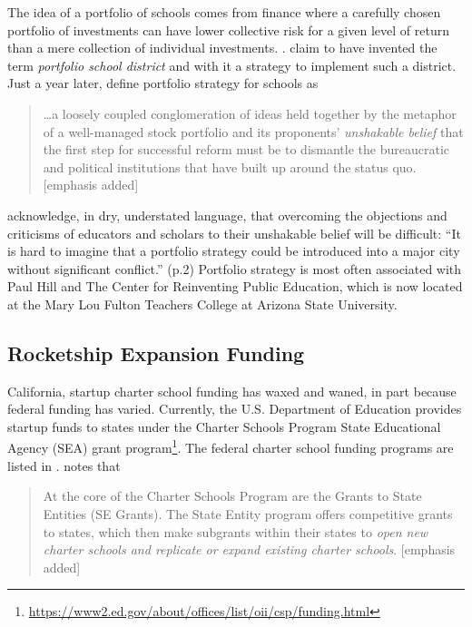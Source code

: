 The idea of a portfolio of schools comes from finance where a carefully chosen portfolio of investments can have lower collective risk for a given level of return than a mere collection of individual investments. \parencite[See ][for an overview of the mathematics of modern portfolio theory]{WikipediaMarkowitz2021}. \citeauthor{Hill.etal2009} claim to have invented the term \textit{portfolio school district} \parencite[1]{Hill.etal2009} and with it a strategy to implement such a district. Just a year later,  \citeauthor{Henig.etal2010} define portfolio strategy for schools as

\bigskip\begin{quote}\OnehalfSpacing%
  \ldots a loosely coupled conglomeration of ideas held together by the metaphor of a well-managed stock portfolio and its proponents’ \textit{unshakable belief} that the first step for successful reform must be to dismantle the bureaucratic and political institutions that have built up around the status quo. [emphasis added] 
\end{quote}

\citeauthor{Hill.etal2009} acknowledge, in dry, understated language, that overcoming the objections and criticisms of educators and scholars to their unshakable belief will be difficult: ``It is hard to imagine that a portfolio strategy could be introduced into a major city without significant conflict.'' (p.2) Portfolio strategy is most often associated with Paul Hill and The Center for Reinventing Public Education, which is now located at the Mary Lou Fulton Teachers College at Arizona State University.

\subsection{Rocketship Expansion Funding}\label{sec:rocketship-expansion-funding}\indent

California, startup charter school funding has waxed and waned, in part because federal funding has varied. Currently, the U.S. Department of Education provides startup funds to states under the Charter Schools Program State Educational Agency (SEA) grant program\footnote{\url{https://www2.ed.gov/about/offices/list/oii/csp/funding.html}}. The federal charter school funding programs are listed in \textcite{NCSRC2020}.  notes that 

\bigskip\begin{quote}\OnehalfSpacing%
  At the core of the Charter Schools Program are the Grants to State Entities (SE Grants). The State Entity program offers competitive grants to states, which then make subgrants within their states to \textit{open new charter schools and replicate or expand existing charter schools}. [emphasis added] \\
\end{quote}

